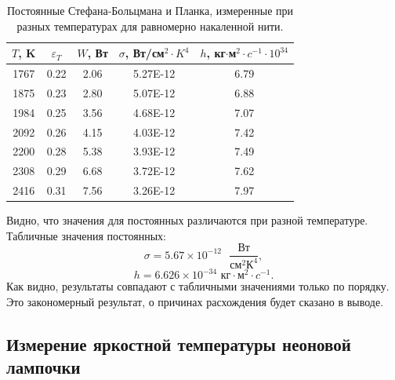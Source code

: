 \documentclass[a4paper, 14pt]{extarticle}%
\newcommand\ECaption[1]{%
     \captionsetup{font=footnotesize}%
     \caption{#1}}
\begin{document}
\begin{table}[h!]
\begin{center}
\begin{tabular}{|c|c|c|c|c|}
\hline
\rowcolor[HTML]{9698ED} 
$T$, K & $\varepsilon_T$ & $W$, Вт & $\sigma$, Вт/см$^2\cdot K^4$ & $h$, кг$\cdot$м$^2\cdot c^{-1}\cdot 10^34$ \\ \hline
1767   & 0.22            & 2.06    & 5.27E-12                     & 6.79                                       \\ \hline
\rowcolor[HTML]{9698ED} 
1875   & 0.23            & 2.80    & 5.07E-12                     & 6.88                                       \\ \hline
1984   & 0.25            & 3.56    & 4.68E-12                     & 7.07                                       \\ \hline
\rowcolor[HTML]{9698ED} 
2092   & 0.26            & 4.15    & 4.03E-12                     & 7.42                                       \\ \hline
2200   & 0.28            & 5.38    & 3.93E-12                     & 7.49                                       \\ \hline
\rowcolor[HTML]{9698ED} 
2308   & 0.29            & 6.68    & 3.72E-12                     & 7.62                                       \\ \hline
2416   & 0.31            & 7.56    & 3.26E-12                     & 7.97                                       \\ \hline
\end{tabular}
\ECaption{Постоянные Стефана-Больцмана и Планка, измеренные при разных температурах для равномерно накаленной нити.}
\end{center}
\end{table}

Видно, что значения для постоянных различаются при разной температуре. Табличные значения постоянных:
\[\sigma = 5.67 \times 10^{-12}\text{ } \frac{\text{Вт}}{\text{см}^2\text{К}^4},\]
\[h = 6.626 \times 10^{-34} \text{ кг}\cdot\text{м}^2\cdot c^{-1}.\]
Как видно, результаты совпадают с табличными значениями только по порядку. Это закономерный результат, о причинах расхождения будет сказано в выводе.
\newpage

\subsection*{Измерение яркостной температуры неоновой лампочки}
\end{document}
